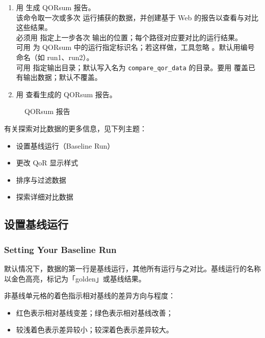 \begin{enumerate}
  \item 用  生成 QORsum 报告。\\
        该命令取一次或多次  运行捕获的数据，并创建基于 Web 的报告以查看与对比这些结果。\\
        必须用  指定上一步各次  输出的位置；每个路径对应要对比的运行结果。\\
        可用  为 QORsum 中的运行指定标识名；若这样做，工具忽略 。默认用编号命名（如 run1、run2）。\\
        可用  指定输出目录；默认写入名为 \texttt{compare\_qor\_data} 的目录。要用  覆盖已有输出数据；默认不覆盖。

  \item 用  查看生成的 QORsum 报告。
\end{enumerate}

\begin{figure}[htbp]
\centering
{}
\caption{QORsum 报告}
\label{fig:qorsum}
\end{figure}

有关探索对比数据的更多信息，见下列主题：
\begin{itemize}
  \item 设置基线运行（Baseline Run）
  \item 更改 QoR 显示样式
  \item 排序与过滤数据
  \item 探索详细对比数据
\end{itemize}

\subsection{设置基线运行}
\subsubsection*{Setting Your Baseline Run}

默认情况下，数据的第一行是基线运行，其他所有运行与之对比。基线运行的名称以金色高亮，标记为「golden」或基线结果。

非基线单元格的着色指示相对基线的差异方向与程度：
\begin{itemize}
  \item 红色表示相对基线变差；绿色表示相对基线改善；
  \item 较浅着色表示差异较小；较深着色表示差异较大。
\end{itemize}

